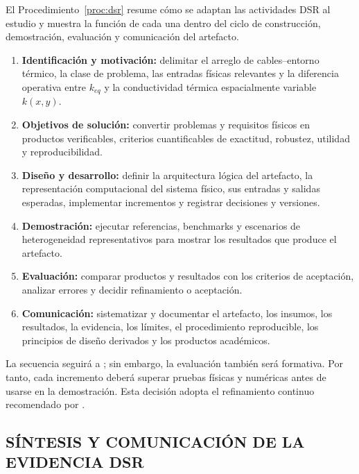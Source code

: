 \documentclass[11pt,a4paper,oneside]{report}
\newcommand{\kx}{k(x,y)}
\begin{document}
El Procedimiento~\ref{proc:dsr} resume cómo se adaptan las actividades DSR al estudio y muestra la función de cada una dentro del ciclo de construcción, demostración, evaluación y comunicación del artefacto.

\begin{procedure}[htbp]
\caption{Proceso DSR adaptado al estudio.}
\label{proc:dsr}
\begin{enumerate}[label=\textbf{A\arabic*.}]
  \item \textbf{Identificación y motivación:} delimitar el arreglo de cables--entorno térmico, la clase de problema, las entradas físicas relevantes y la diferencia operativa entre $k_{eq}$ y la conductividad térmica espacialmente variable $\kx$.
  \item \textbf{Objetivos de solución:} convertir problemas y requisitos físicos en productos verificables, criterios cuantificables de exactitud, robustez, utilidad y reproducibilidad.
  \item \textbf{Diseño y desarrollo:} definir la arquitectura lógica del artefacto, la representación computacional del sistema físico, sus entradas y salidas esperadas, implementar incrementos y registrar decisiones y versiones.
  \item \textbf{Demostración:} ejecutar referencias, benchmarks y escenarios de heterogeneidad representativos para mostrar los resultados que produce el artefacto.
  \item \textbf{Evaluación:} comparar productos y resultados con los criterios de aceptación, analizar errores y decidir refinamiento o aceptación.
  \item \textbf{Comunicación:} sistematizar y documentar el artefacto, los insumos, los resultados, la evidencia, los límites, el procedimiento reproducible, los principios de diseño derivados y los productos académicos.
\end{enumerate}
\end{procedure}

La secuencia seguirá a \textcite[55--56]{peffers2007}; sin embargo, la evaluación también será formativa. Por tanto, cada incremento deberá superar pruebas físicas y numéricas antes de usarse en la demostración. Esta decisión adopta el refinamiento continuo recomendado por \textcite[198--203]{delport2024}.

\subsection{SÍNTESIS Y COMUNICACIÓN DE LA EVIDENCIA DSR}
\label{subsec:sintesis-dsr}
\end{document}

